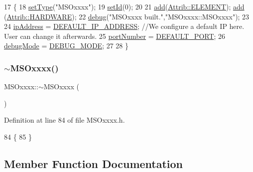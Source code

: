 \begin{DoxyCode}
17 \{
18     \hyperlink{classObject_aae534cc9d982bcb9b99fd505f2e103a5}{setType}(\textcolor{stringliteral}{"MSOxxxx"});
19     \hyperlink{classObject_a398fe08cba594a0ce6891d59fe4f159f}{setId}(0);
20 
21     \hyperlink{classAttrib_a235f773af19c900264a190b00a3b4ad7}{add}(\hyperlink{classAttrib_a69e171d7cc6417835a5a306d3c764235a7788bc5dd333fd8ce18562b269c9dab1}{Attrib::ELEMENT}); \hyperlink{classAttrib_a235f773af19c900264a190b00a3b4ad7}{add} (\hyperlink{classAttrib_a69e171d7cc6417835a5a306d3c764235a61ceb22149f365f1780d18f9d1459423}{Attrib::HARDWARE});
22     \hyperlink{classObject_aac010553f022165573714b7014a15f0d}{debug}(\textcolor{stringliteral}{"MSOxxxx built."},\textcolor{stringliteral}{"MSOxxxx::MSOxxxx"});
23 
24     \hyperlink{classMSOxxxx_aa55bdb0feb799b195628fe6ef0222b62}{ipAddress}  = \hyperlink{MSOxxxx_8h_a32de0e3cfb4b33d5da084bd19d16e11b}{DEFAULT\_IP\_ADDRESS};                                 \textcolor{comment}{//We
       configure a default IP here. User can change it afterwards.}
25     \hyperlink{classMSOxxxx_a242bcf72c701cd20d86d25315fc6180f}{portNumber}    =   \hyperlink{MSOxxxx_8h_a16b710f592bf8f7900666392adc444dc}{DEFAULT\_PORT};
26     \hyperlink{classMSOxxxx_a826ba82e93bbe5780169107a31dbfd29}{debugMode}      = \hyperlink{MSOxxxx_8h_ac80a3592e72fd96b772ee47a7d8e0d0a}{DEBUG\_MODE};
27 
28 \}
\end{DoxyCode}
\mbox{\label{classMSOxxxx_a567c156d78fbeab9d61bf8ec9acac851}} 
\subsubsection{\texorpdfstring{$\sim$\+M\+S\+Oxxxx()}{~MSOxxxx()}}
{\footnotesize\ttfamily M\+S\+Oxxxx\+::$\sim$\+M\+S\+Oxxxx (\begin{DoxyParamCaption}{ }\end{DoxyParamCaption})\hspace{0.3cm}{\ttfamily [inline]}}



Definition at line 84 of file M\+S\+Oxxxx.\+h.


\begin{DoxyCode}
84             \{
85   \}
\end{DoxyCode}


\subsection{Member Function Documentation}
\mbox{\label{classAttrib_a235f773af19c900264a190b00a3b4ad7}} 
